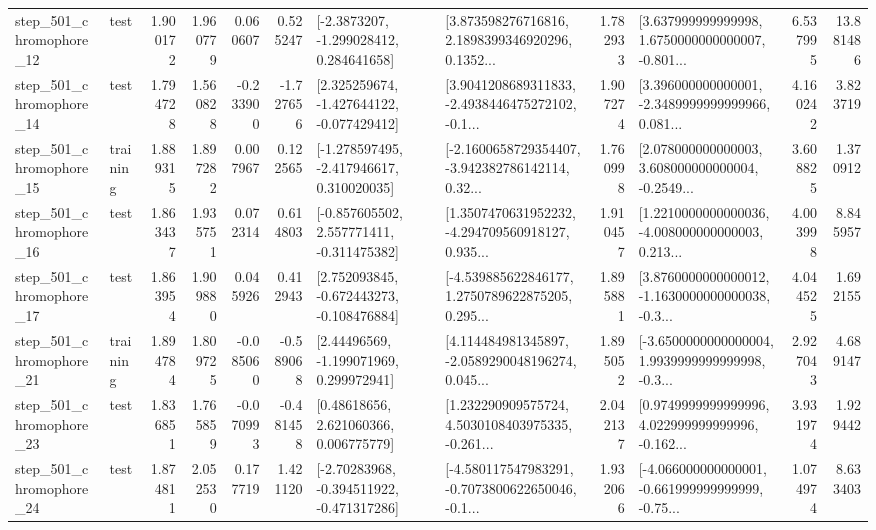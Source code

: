 \begin{tabular}{llrrrrllrlrr}
  step\_501\_chromophore\_12 &      test &      1.900172 &    1.960779 &      0.060607 &  0.525247 &     [-2.3873207, -1.299028412, 0.284641658] &  [3.873598276716816, 2.1898399346920296, 0.1352... &       1.782933 &  [3.637999999999998, 1.6750000000000007, -0.801... &            6.537995 &         13.881486 \\
  step\_501\_chromophore\_14 &      test &      1.794728 &    1.560828 &     -0.233900 & -1.727656 &   [2.325259674, -1.427644122, -0.077429412] &  [3.9041208689311833, -2.4938446475272102, -0.1... &       1.907274 &  [3.396000000000001, -2.3489999999999966, 0.081... &            4.160242 &          3.823719 \\
  step\_501\_chromophore\_15 &  training &      1.889315 &    1.897282 &      0.007967 &  0.122565 &   [-1.278597495, -2.417946617, 0.310020035] &  [-2.1600658729354407, -3.942382786142114, 0.32... &       1.760998 &  [2.078000000000003, 3.608000000000004, -0.2549... &            3.608825 &          1.370912 \\
  step\_501\_chromophore\_16 &      test &      1.863437 &    1.935751 &      0.072314 &  0.614803 &   [-0.857605502, 2.557771411, -0.311475382] &  [1.3507470631952232, -4.294709560918127, 0.935... &       1.910457 &  [1.2210000000000036, -4.008000000000003, 0.213... &            4.003998 &          8.845957 \\
  step\_501\_chromophore\_17 &      test &      1.863954 &    1.909880 &      0.045926 &  0.412943 &   [2.752093845, -0.672443273, -0.108476884] &  [-4.539885622846177, 1.2750789622875205, 0.295... &       1.895881 &  [3.8760000000000012, -1.1630000000000038, -0.3... &            4.044525 &          1.692155 \\
  step\_501\_chromophore\_21 &  training &      1.894784 &    1.809725 &     -0.085060 & -0.589068 &     [2.44496569, -1.199071969, 0.299972941] &  [4.114484981345897, -2.0589290048196274, 0.045... &       1.895052 &  [-3.6500000000000004, 1.9939999999999998, -0.3... &            2.927043 &          4.689147 \\
  step\_501\_chromophore\_23 &      test &      1.836851 &    1.765859 &     -0.070993 & -0.481458 &      [0.48618656, 2.621060366, 0.006775779] &  [1.232290909575724, 4.5030108403975335, -0.261... &       2.042137 &  [0.9749999999999996, 4.022999999999996, -0.162... &            3.931974 &          1.929442 \\
  step\_501\_chromophore\_24 &      test &      1.874811 &    2.052530 &      0.177719 &  1.421120 &   [-2.70283968, -0.394511922, -0.471317286] &  [-4.580117547983291, -0.7073800622650046, -0.1... &       1.932066 &  [-4.066000000000001, -0.661999999999999, -0.75... &            1.074974 &          8.633403 \\

\end{tabular}
